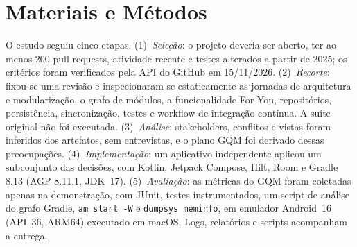 \section{Materiais e Métodos}\label{sec:metodos}
O estudo seguiu cinco etapas. (1)~\emph{Seleção}: o projeto deveria ser
aberto, ter ao menos 200 pull requests, atividade recente e testes alterados
a partir de 2025; os critérios foram verificados pela API do GitHub em
15/11/2026. (2)~\emph{Recorte}: fixou-se uma revisão e inspecionaram-se
estaticamente as jornadas de arquitetura e modularização, o grafo de módulos,
a funcionalidade For You, repositórios, persistência, sincronização, testes e
workflow de integração contínua. A suíte original não foi executada.
(3)~\emph{Análise}: stakeholders, conflitos e vistas foram inferidos dos
artefatos, sem entrevistas, e o plano GQM foi derivado dessas preocupações.
(4)~\emph{Implementação}: um aplicativo independente aplicou um subconjunto
das decisões, com Kotlin, Jetpack Compose, Hilt, Room e Gradle 8.13 (AGP
8.11.1, JDK~17). (5)~\emph{Avaliação}: as métricas do GQM foram coletadas
apenas na demonstração, com JUnit, testes instrumentados, um script de
análise do grafo Gradle, \texttt{am start -W} e \texttt{dumpsys meminfo}, em
emulador Android~16 (API~36, ARM64) executado em macOS.
Logs, relatórios e scripts acompanham a entrega.
